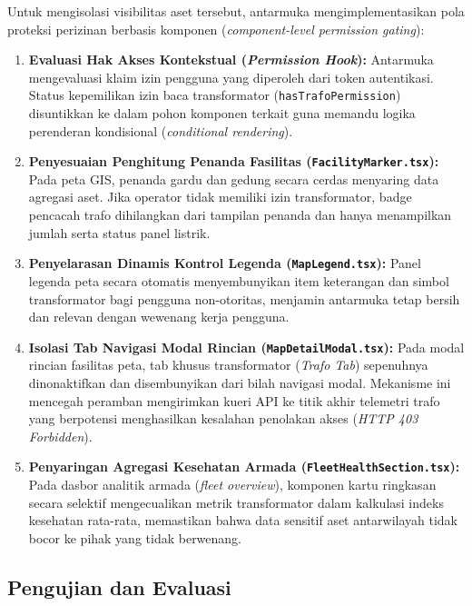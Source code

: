 Untuk mengisolasi visibilitas aset tersebut, antarmuka mengimplementasikan pola proteksi perizinan berbasis komponen (\textit{component-level permission gating}):
\begin{enumerate}[label=\arabic*., leftmargin=*, itemsep=0pt]
  \item \textbf{Evaluasi Hak Akses Kontekstual (\textit{Permission Hook}):} Antarmuka mengevaluasi klaim izin pengguna yang diperoleh dari token autentikasi. Status kepemilikan izin baca transformator (\texttt{hasTrafoPermission}) disuntikkan ke dalam pohon komponen terkait guna memandu logika perenderan kondisional (\textit{conditional rendering}).
  \item \textbf{Penyesuaian Penghitung Penanda Fasilitas (\texttt{FacilityMarker.tsx}):} Pada peta GIS, penanda gardu dan gedung secara cerdas menyaring data agregasi aset. Jika operator tidak memiliki izin transformator, badge pencacah trafo dihilangkan dari tampilan penanda dan hanya menampilkan jumlah serta status panel listrik.
  \item \textbf{Penyelarasan Dinamis Kontrol Legenda (\texttt{MapLegend.tsx}):} Panel legenda peta secara otomatis menyembunyikan item keterangan dan simbol transformator bagi pengguna non-otoritas, menjamin antarmuka tetap bersih dan relevan dengan wewenang kerja pengguna.
  \item \textbf{Isolasi Tab Navigasi Modal Rincian (\texttt{MapDetailModal.tsx}):} Pada modal rincian fasilitas peta, tab khusus transformator (\textit{Trafo Tab}) sepenuhnya dinonaktifkan dan disembunyikan dari bilah navigasi modal. Mekanisme ini mencegah peramban mengirimkan kueri API ke titik akhir telemetri trafo yang berpotensi menghasilkan kesalahan penolakan akses (\textit{HTTP 403 Forbidden}).
  \item \textbf{Penyaringan Agregasi Kesehatan Armada (\texttt{FleetHealthSection.tsx}):} Pada dasbor analitik armada (\textit{fleet overview}), komponen kartu ringkasan secara selektif mengecualikan metrik transformator dalam kalkulasi indeks kesehatan rata-rata, memastikan bahwa data sensitif aset antarwilayah tidak bocor ke pihak yang tidak berwenang.
\end{enumerate}

\subsection{Pengujian dan Evaluasi}

